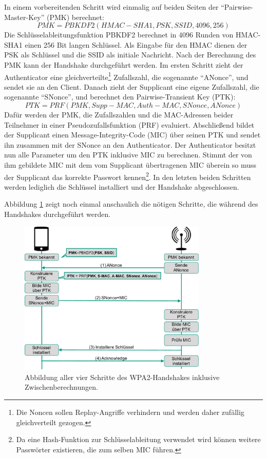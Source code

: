 In einem vorbereitenden Schritt wird einmalig auf beiden Seiten der \enquote{Pairwise-Master-Key} (PMK) berechnet:
\[PMK = PBKDF2(HMAC-SHA1, PSK, SSID, 4096, 256)\]
Die Schlüsselableitungsfunktion PBKDF2  berechnet in 4096 Runden von HMAC-SHA1 einen 256 Bit langen Schlüssel.
Als Eingabe für den HMAC dienen der PSK als Schlüssel und die SSID als initiale Nachricht.
Nach der Berechnung des PMK kann der Handshake durchgeführt werden.
Im ersten Schritt zieht der Authenticator eine gleichverteilte\footnote{Die Noncen sollen Replay-Angriffe verhindern und werden daher zufällig gleichverteilt gezogen.} Zufallszahl, die sogenannte \enquote{ANonce}, und sendet sie an den Client.
Danach zieht der Supplicant eine eigene Zufallszahl, die sogenannte \enquote{SNonce}, und berechnet den Pairwise-Transient Key (PTK):
\[PTK = PRF(PMK, Supp-MAC, Auth-MAC, SNonce, ANonce)\]
Dafür werden der PMK, die Zufallszahlen und die MAC-Adressen beider Teilnehmer in einer Pseudozufallsfunktion (PRF) evaluiert.
Abschließend bildet der Supplicant einen Message-Integrity-Code (MIC) über seinen PTK und sendet ihn zusammen mit der SNonce an den Authenticator.
Der Authenticator besitzt nun alle Parameter um den PTK inklusive MIC zu berechnen.
Stimmt der von ihm gebildete MIC mit dem vom Supplicant übertragenen MIC überein so muss der Supplicant das korrekte Passwort kennen\footnote{Da eine Hash-Funktion zur Schlüsselableitung verwendet wird können weitere Passwörter existieren, die zum selben MIC führen.}.
In den letzten beiden Schritten werden lediglich die Schlüssel installiert und der Handshake abgeschlossen.

Abbildung \ref{fig:wpa2handshake} zeigt noch einmal anschaulich die nötigen Schritte, die während des Handshakes durchgeführt werden.
\begin{figure}[ht]
	\centering
	\includegraphics[width=0.80\textwidth]{graphics/wpa2handshake}
	\caption[WPA2 Handshake]{Abbildung aller vier Schritte des WPA2-Handshakes inklusive Zwischenberechnungen.}
	\label{fig:wpa2handshake}
\end{figure}

\FloatBarrier